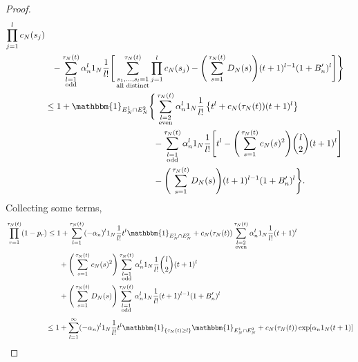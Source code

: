\documentclass[12pt,authoryear]{article}
\theoremstyle{definition}
\newcommand{\I}[1]{\mathbbm{1}_{\{#1\}}}
\newcommand{\1}[1]{\mathbbm{1}_{#1}}
\newcommand{\ON}{1_N}
\begin{document}
\begin{proof}
\begin{align*}
        \prod_{j=1}^l c_N(s_j) \\
    &\phantom{\leq}- \sum_{\substack{l=1 \\ \text{odd} }}^{\tau_N(t)} 
        \alpha_n^l \ON \frac{1}{l!} 
        \Bigg[ \sum_{\substack{ s_1, \dots, s_l =1 \\ \text{all distinct} }}^{\tau_N(t)}
        \prod_{j=1}^l c_N(s_j)
        - \Bigg( \sum_{s=1}^{\tau_N(t)} D_N(s) \Bigg) 
        (t+1)^{l-1} (1+B_n^\prime)^l \Bigg] \Bigg\} \\
&\leq 1 + \1{E_N^1 \cap E_N^2} \Bigg\{ \sum_{\substack{l=2 \\ \text{even} }}^{\tau_N(t)} 
        \alpha_n^l \ON \frac{1}{l!} 
        \left\{ t^l + c_N(\tau_N(t)) (t+1)^l \right\} \\
    &\phantom{\leq 1 + \1{E_N^1 \cap E_N^2} \Bigg\{}- \sum_{\substack{l=1 \\ \text{odd} }}^{\tau_N(t)} 
        \alpha_n^l \ON \frac{1}{l!} 
        \Bigg[ t^l - \Bigg( \sum_{s=1}^{\tau_N(t)} c_N(s)^2 \Bigg) 
        \binom{l}{2} (t+1)^l \Bigg] \\
    &\phantom{\leq 1 + \1{E_N^1 \cap E_N^2} \Bigg\{}- \Bigg( \sum_{s=1}^{\tau_N(t)} D_N(s) \Bigg) 
        (t+1)^{l-1} (1+B_n^\prime)^l \Bigg\}.
\end{align*}
Collecting some terms,
\begin{align}
&\prod_{r=1}^{\tau_N(t)} (1-p_r)
\leq 1 + \sum_{l=1}^{\tau_N(t)} (-\alpha_n)^l \ON \frac{1}{l!} t^l 
        \1{E_N^1 \cap E_N^2}
        + c_N(\tau_N(t)) \sum_{\substack{l=2 \\ \text{even} }}^{\tau_N(t)}
        \alpha_n^l \ON \frac{1}{l!} (t+1)^l \notag\\
    &\phantom{\prod_{r=1}^{\tau_N(t)} (1-p_r) \leq 1} + \Bigg( \sum_{s=1}^{\tau_N(t)} c_N(s)^2 \Bigg)
        \sum_{\substack{l=1 \\ \text{odd} }}^{\tau_N(t)} \alpha_n^l
        \ON \frac{1}{l!} \binom{l}{2} (t+1)^l \notag\\
    &\phantom{\prod_{r=1}^{\tau_N(t)} (1-p_r) \leq 1} + \Bigg( \sum_{s=1}^{\tau_N(t)} D_N(s) \Bigg) 
        \sum_{\substack{l=1 \\ \text{odd} }}^{\tau_N(t)} \alpha_n^l
        \ON \frac{1}{l!} (t+1)^{l-1} (1+B_n^\prime)^l \notag\\
&\phantom{\prod_{r=1}^{\tau_N(t)} (1-p_r)}\leq 1 + \sum_{l=1}^{\infty} (-\alpha_n)^l \ON \frac{1}{l!} t^l
        \I{\tau_N(t) \geq l} \1{E_N^1 \cap E_N^2}      
        + c_N(\tau_N(t)) \exp[ \alpha_n \ON (t+1) ] \notag\\

\end{align}
\end{proof}
\end{document}

